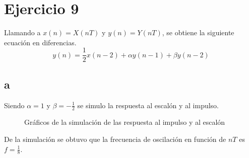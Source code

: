 \documentclass[../../guia1.tex]{subfiles}
\begin{document}
\section*{Ejercicio 9}
Llamando a $x(n)=X(nT)$ y $y(n)=Y(nT)$, se obtiene la siguiente ecuación en diferencias. 
\begin{equation}
y(n)=\frac{1}{2} x(n-2) + \alpha y(n-1) + \beta y(n-2)  
\end{equation}

\subsection{a}
Siendo $\alpha = 1$ y $\beta = -\frac{1}{2}$ se simulo la respuesta al escalón y al impulso.
\begin{figure}[H]
 \centering

 \caption{Gráficos de la simulación de las respuesta al impulso y al escalón}
 \label{f:eja}
\end{figure}
De la simulación se obtuvo que la frecuencia de oscilación en función de $nT$ es $f= \frac{1}{8}$.
\end{document}
